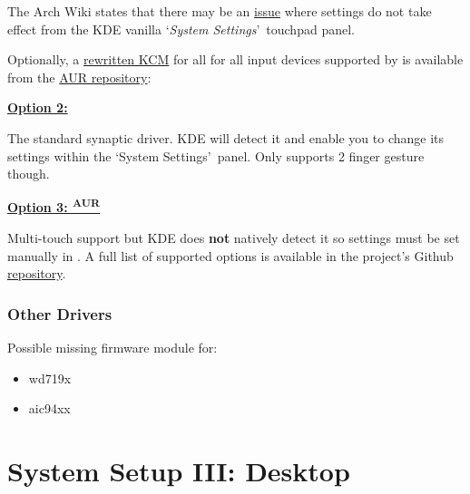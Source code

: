 The Arch Wiki states that there may be an \href{https://wiki.archlinux.org/index.php/Libinput#Touchpad_settings_not_taking_effect_in_KDE.27s_Touchpad_KCM}{issue} where settings do not take effect from the KDE vanilla \lq\textit{System Settings}\rq\ touchpad panel. 

Optionally, a \href{https://github.com/amezin/pointing-devices-kcm}{rewritten KCM} for all for all input devices supported by  is available from the  \href{https://aur.archlinux.org/packages/kcm-pointing-devices-git/}{AUR repository}:


\vspace*{1em}
\textbf{\textcolor{textgrey}{\uline{Option 2: }}}

The standard synaptic driver. KDE will detect it and enable you to change its settings within the \lq System Settings\rq\ panel. Only supports 2 finger gesture though.


\vspace*{1em}
\textbf{\textcolor{textgrey}{\uline{Option 3: \textsuperscript{AUR}}}}

Multi-touch support but KDE does \textbf{not} natively detect it so settings must be set manually in . A full list of supported options is available in the project's Github \href{https://github.com/p2rkw/xf86-input-mtrack}{repository}.


\subsubsection{Other Drivers}

Possible missing firmware module for:
\begin{itemize}[noitemsep,topsep=0pt,leftmargin=*]
	\item wd719x
	\item aic94xx
\end{itemize}


\section{System Setup III: Desktop}

